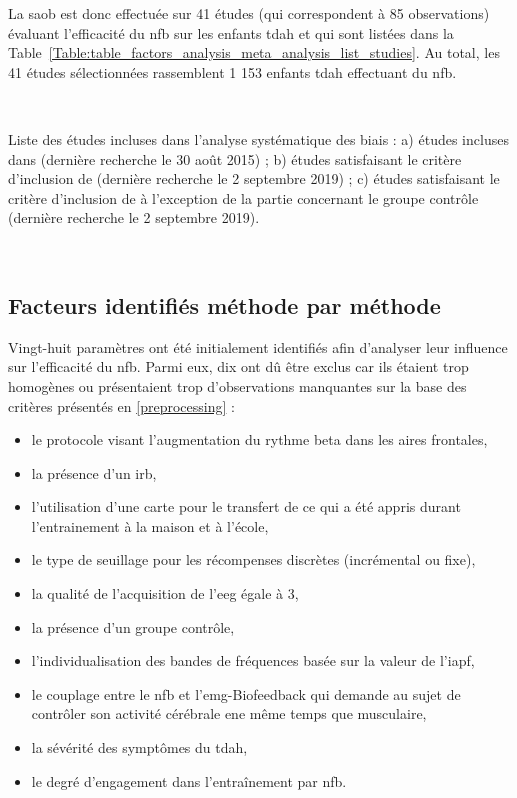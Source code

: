 La \gls{saob} est donc effectuée sur 41 études (qui correspondent à 85 observations) évaluant l'efficacité du \gls{nfb} sur les enfants \gls{tdah} et 
qui sont listées dans la Table~\ref{Table:table_factors_analysis_meta_analysis_list_studies}. Au total, les 41 études sélectionnées rassemblent 
1 153 enfants \gls{tdah} effectuant du \gls{nfb}.

\newpage\
\begin{table}[h!]
  \centering
  \caption[Liste des études incluses dans l'analyse systématique des biais.]{Liste des études incluses dans l'analyse systématique des biais : a) études incluses dans \citet{Cortese2016}
	(dernière recherche le 30 août 2015) ; b) études satisfaisant le critère d'inclusion de \citet{Cortese2016} (dernière recherche le 2 septembre 2019) ; c) études 
	satisfaisant le critère d'inclusion de \citet{Cortese2016} à l'exception de la partie concernant le groupe contrôle (dernière recherche le 2 septembre 2019).}
  
  \label{Table:table_factors_analysis_meta_analysis_list_studies}
\end{table}

\newpage\
\subsection{Facteurs identifiés méthode par méthode}

Vingt-huit paramètres ont été initialement identifiés afin d'analyser leur influence sur l'efficacité du \gls{nfb}. Parmi eux, dix ont dû être exclus car ils étaient trop
homogènes ou présentaient trop d'observations manquantes sur la base des critères présentés en \ref{preprocessing} : 
\begin{itemize}
	\item le protocole visant l'augmentation du rythme beta dans les aires frontales,
	\item la présence d'un \gls{irb},
  \item l'utilisation d'une carte pour le transfert de ce qui a été appris durant l'entrainement à la maison et à l'école, 
  \item le type de seuillage pour les récompenses discrètes (incrémental ou fixe),
  \item la qualité de l'acquisition de l'\gls{eeg} égale à 3,
	\item la présence d'un groupe contrôle,
	\item l'individualisation des bandes de fréquences basée sur la valeur de l'\gls{iapf},
	\item le couplage entre le \gls{nfb} et l'\gls{emg}-Biofeedback qui demande au sujet de contrôler son activité cérébrale ene même temps que musculaire,
	\item la sévérité des symptômes du \gls{tdah},
	\item le degré d'engagement dans l'entraînement par \gls{nfb}.
\end{itemize} 

